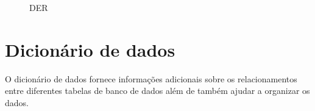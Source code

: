 \begin{figure}[H]
    \centering
    \caption{\label{der}DER}
\end{figure}

\section{Dicionário de dados}
O dicionário de dados fornece informações adicionais sobre os relacionamentos entre diferentes tabelas de banco de dados além de também ajudar a organizar os dados.

